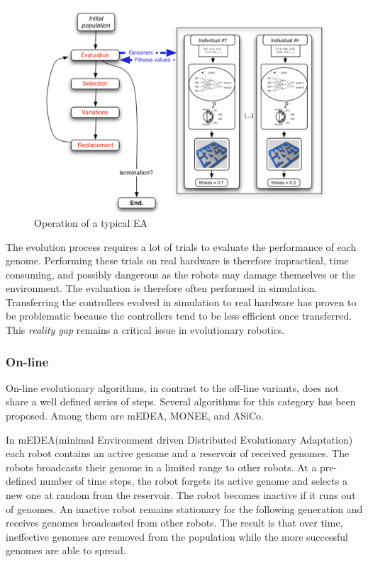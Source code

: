 \begin{figure}[H]
	
	\centering
	\includegraphics[width=\textwidth]{chapters/res/offline-ea.png}
	\caption{Operation of a typical EA\cite{doncieux_evolutionary_2011}}
	\label{fig:offline-ea}
\end{figure}

The evolution process requires a lot of trials to evaluate the performance of each genome. Performing these trials on real hardware is therefore impractical, time consuming, and possibly dangerous as the robots may damage themselves or the environment.
The evaluation is therefore often performed in simulation\cite{koos_crossing_2010}.
Transferring the controllers evolved in simulation to real hardware has proven to be problematic because the controllers tend to be less efficient once transferred.
This \emph{reality gap} remains a critical issue in evolutionary robotics\cite{koos_crossing_2010}.



\subsubsection*{On-line}
On-line evolutionary algorithms, in contrast to the off-line variants, does not share a well defined series of steps. Several algorithms for this category has been proposed. Among them are mEDEA\cite{montanier_adaptive_2014}, MONEE\cite{noskov_monee:_2013}, and ASiCo\cite{hutchison_task-driven_2011}. 

In mEDEA(minimal Environment driven Distributed Evolutionary Adaptation) each robot contains an active genome and a reservoir of received genomes.
The robots broadcasts their genome in a limited range to other robots.
At a pre-defined number of time steps, the robot forgets its active genome and selects a new one at random from the reservoir.
The robot becomes inactive if it runs out of genomes.
An inactive robot remains stationary for the following generation and receives genomes broadcasted from other robots.
The result is that over time, ineffective genomes are removed from the population while the more successful genomes are able to spread.

